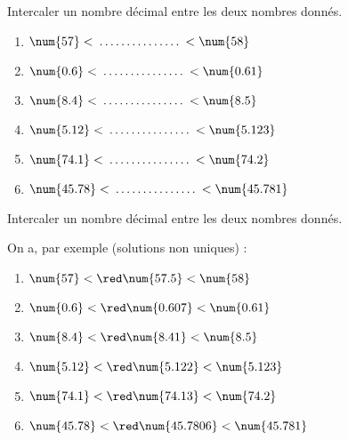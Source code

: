 \begin{exercice}
    Intercaler un nombre décimal entre les deux nombres donnés.

    \begin{multicols}{2}
        \begin{enumerate}
            \item $\num{57   } < \makebox[0.2\linewidth]{\dotfill} < \num{58    }$
            \item $\num{0.6  } < \makebox[0.2\linewidth]{\dotfill} < \num{0.61  }$ 
            \item $\num{8.4  } < \makebox[0.2\linewidth]{\dotfill} < \num{8.5   }$
            \item $\num{5.12 } < \makebox[0.2\linewidth]{\dotfill} < \num{5.123 }$
            \item $\num{74.1 } < \makebox[0.2\linewidth]{\dotfill} < \num{74.2  }$
            \item $\num{45.78} < \makebox[0.2\linewidth]{\dotfill} < \num{45.781}$
        \end{enumerate}
    \end{multicols}
\end{exercice}
 
\begin{corrige}
    Intercaler un nombre décimal entre les deux nombres donnés.

    {\color{red}On a, par exemple (solutions non uniques) :}
    
    \begin{enumerate}
        \item $\num{57   } < {\red \num{57.5   }} < \num{58    }$
        \item $\num{0.6  } < {\red \num{0.607  }} < \num{0.61  }$
        \item $\num{8.4  } < {\red \num{8.41   }} < \num{8.5   }$
        \item $\num{5.12 } < {\red \num{5.122  }} < \num{5.123 }$
        \item $\num{74.1 } < {\red \num{74.13  }} < \num{74.2  }$ 
        \item $\num{45.78} < {\red \num{45.7806}} < \num{45.781}$
    \end{enumerate}
\end{corrige}